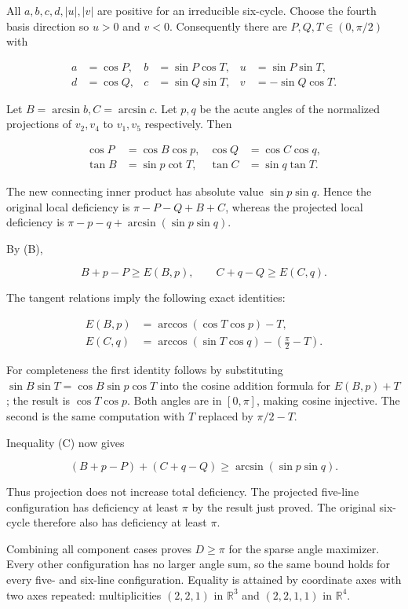 \documentclass[11pt,a4paper]{article}
\begin{document}
All \(a,b,c,d,|u|,|v|\) are positive for an irreducible six-cycle. Choose the fourth basis direction so \(u>0\) and \(v<0\). Consequently there are \(P,Q,T\in(0,\pi/2)\) with

\[
\begin{aligned}a&=\cos P,&b&=\sin P\cos T,&u&=\sin P\sin T,\\d&=\cos Q,&c&=\sin Q\sin T,&v&=-\sin Q\cos T.\end{aligned}
\]

Let \(B=\arcsin b,C=\arcsin c\). Let \(p,q\) be the acute angles of the normalized projections of \(v_2,v_4\) to \(v_1,v_5\) respectively. Then

\[
\begin{aligned}\cos P&=\cos B\cos p,&\cos Q&=\cos C\cos q,\\\tan B&=\sin p\cot T,&\tan C&=\sin q\tan T.\end{aligned}
\]

The new connecting inner product has absolute value \(\sin p\sin q\). Hence the original local deficiency is \(\pi-P-Q+B+C\), whereas the projected local deficiency is \(\pi-p-q+\arcsin(\sin p\sin q)\).

By (B),

\[
B+p-P\ge E(B,p),\qquad C+q-Q\ge E(C,q).
\]

The tangent relations imply the following exact identities:

\[
\begin{aligned}E(B,p)&=\arccos(\cos T\cos p)-T,\\E(C,q)&=\arccos(\sin T\cos q)-\left(\frac{\pi}{2}-T\right).\end{aligned}
\]

For completeness the first identity follows by substituting \(\sin B\sin T=\cos B\sin p\cos T\) into the cosine addition formula for \(E(B,p)+T\); the result is \(\cos T\cos p\). Both angles are in \([0,\pi]\), making cosine injective. The second is the same computation with \(T\) replaced by \(\pi/2-T\).

Inequality (C) now gives

\[
(B+p-P)+(C+q-Q)\ge\arcsin(\sin p\sin q).
\]

Thus projection does not increase total deficiency. The projected five-line configuration has deficiency at least \(\pi\) by the result just proved. The original six-cycle therefore also has deficiency at least \(\pi\).

Combining all component cases proves \(D\ge\pi\) for the sparse angle maximizer. Every other configuration has no larger angle sum, so the same bound holds for every five- and six-line configuration. Equality is attained by coordinate axes with two axes repeated: multiplicities \((2,2,1)\) in \(\mathbb R^3\) and \((2,2,1,1)\) in \(\mathbb R^4\).
\end{document}
